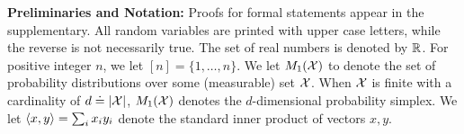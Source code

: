 \newcommand{\ind}[1]{\mathbb{I}\{#1\}}
%
\vspace{-5pt}
\noindent
{\bf Preliminaries and Notation:} Proofs for formal statements appear in the supplementary. 
All random variables are printed with upper case letters, while the reverse is not necessarily true.
The set of real numbers is denoted by $\mathbb{R}$. For positive integer $n$, we let
$[n] = \{1,\dots,n\}$. %
We let $M_1(\mathcal{X})$ to denote the set of probability distributions over some (measurable) set $\mathcal{X}$.
When $\mathcal{X}$ is finite with a cardinality of $d \doteq |\mathcal{X}|$, 
$M_1(\mathcal{X})$ denotes the $d$-dimensional probability simplex.  
We let $\langle x,y \rangle = \sum_i x_i y_i$ denote the standard inner product of vectors $x,y$.

